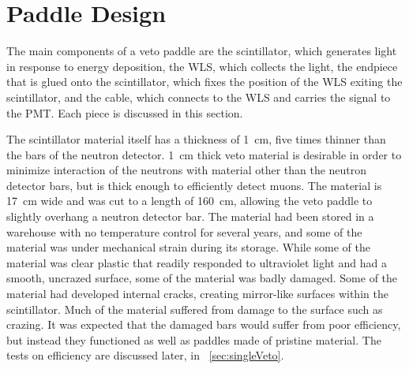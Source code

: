 \section{Paddle Design}

The main components of a veto paddle are the scintillator, which generates light in response to energy deposition, the WLS, which collects the light, the endpiece that is glued onto the scintillator, which fixes the position of the WLS exiting the scintillator, and the cable, which connects to the WLS and carries the signal to the PMT.  Each piece is discussed in this section.

The scintillator material itself has a thickness of 1~cm, five times thinner than the bars of the neutron detector.  1~cm thick veto material is desirable in order to minimize interaction of the neutrons with material other than the neutron detector bars, but is thick enough to efficiently detect muons.  The material is 17~cm wide and was cut to a length of 160~cm, allowing the veto paddle to slightly overhang a neutron detector bar.  The material had been stored in a warehouse with no temperature control for several years, and some of the material was under mechanical strain during its storage.  While some of the material was clear plastic that readily responded to ultraviolet light and had a smooth, uncrazed surface, some of the material was badly damaged.  Some of the material had developed internal cracks, creating mirror-like surfaces within the scintillator.  Much of the material suffered from damage to the surface such as crazing.  It was expected that the damaged bars would suffer from poor efficiency, but instead they functioned as well as paddles made of pristine material.  The tests on efficiency are discussed later, in {\sect}~\ref{sec:singleVeto}.

